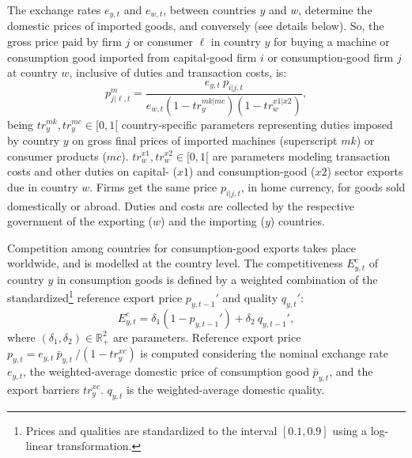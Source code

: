\documentclass[a4paper,11pt]{article}
\begin{document}
The exchange rates $e_{y,t}$ and $e_{w,t}$, between countries $y$ and $w$, determine the domestic prices of imported goods, and conversely (see details below). So, the gross price paid by firm $j$ or consumer $\ell$ in country $y$ for buying a machine or consumption good imported from capital-good firm $i$ or consumption-good firm $j$ at country $w$, inclusive of duties and transaction costs, is:
\begin{equation}
	p_{j|\ell,t}^m = \dfrac{ e_{y,t} ~ p_{i|j,t} }{ e_{w,t} \left( 1 - {tr}_y^{mk|mc} \right) \left( 1 - {tr}_w^{x1|x2} \right) },
\end{equation}
being ${tr}_y^{mk}, {tr}_y^{mc} \in [0,1[$ country-specific parameters representing duties imposed by country $y$ on gross final prices of imported machines (superscript $mk$) or consumer products ($mc$). ${tr}_w^{x1}, {tr}_w^{x2} \in [0,1[$ are parameters modeling transaction costs and other duties on capital- ($x1$) and consumption-good ($x2$) sector exports due in country $w$. Firms get the same price $p_{i|j,t}$, in home currency, for goods sold domestically or abroad. Duties and costs are collected by the respective government of the exporting ($w$) and the importing ($y$) countries.

Competition among countries for consumption-good exports takes place worldwide, and is modelled at the country level. The competitiveness $E_{y,t}^c$ of country $y$ in consumption goods is defined by a weighted combination of the standardized\footnote{Prices and qualities are standardized to the interval $[0.1, 0.9]$ using a log-linear transformation.} reference export price $p_{y,t-1}'$ and quality $q_{y,t}'$:
\begin{equation}
	E_{y,t}^c = \delta_1 \left( 1 - p_{y,t-1}' \right) + \delta_2 ~ q_{y,t-1}',
\end{equation}
where $(\delta_1, \delta_2) \in \mathbb{R}_+^2$ are parameters. Reference export price $p_{y,t} = e_{y,t} ~ \bar{p}_{y,t} ~ / \left( 1 - {tr}_y^{xc} \right)$ is computed considering the nominal exchange rate $e_{y,t}$, the weighted-average domestic price of consumption good $\bar{p}_{y,t}$, and the export barriers ${tr}_y^{xc}$. $q_{y,t}$ is the weighted-average domestic quality.
\end{document}
